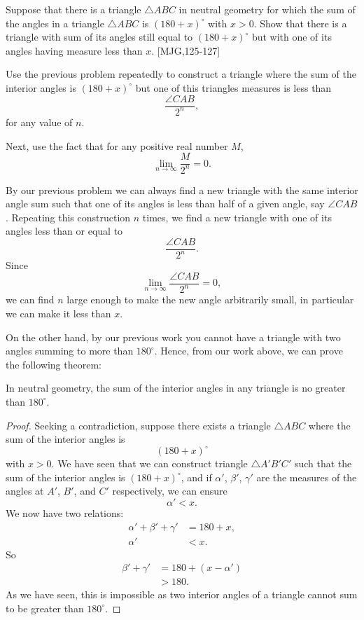 \documentclass[instructornotes]{ximera}
\begin{document}
\begin{problem}
\label{121} Suppose that there is a triangle $\triangle ABC$ in
neutral geometry for which the sum of the angles in a triangle $\triangle
ABC$ is $\left( 180+x\right)^\circ$ with $x>0$. Show that there is a
triangle with sum of its angles still equal to $\left(180+x\right)^\circ$
but with one of its angles having measure less than $x$. [MJG,125-127]


\begin{hint}
Use the previous problem repeatedly to construct a triangle where the sum of the
interior angles is $(180+x)^\circ$ but one of this triangles measures is less than
\[
\frac{\angle CAB}{2^n},
\]
for any value of $n$.
\end{hint}
\begin{hint}
Next, use the fact that for any positive real number $M$,
\[
\lim_{n\to \infty}\frac{M}{2^n} = 0.
\]
\end{hint}
\begin{freeResponse}
By our previous problem we can always find a new triangle with the
same interior angle sum such that one of its angles is less than half
of a given angle, say $\angle CAB$. Repeating this construction $n$
times, we find a new triangle with one of its angles less than or
equal to
\[
\frac{\angle CAB}{2^n}.
\]
Since 
\[
\lim_{n\to \infty}\frac{\angle CAB}{2^n} = 0,
\]
we can find $n$ large enough to make the new angle arbitrarily small, in
particular we can make it less than $x$.
\end{freeResponse}

\end{problem}


On the other hand, by our previous work
you cannot have a triangle with two angles summing to more than
$180^\circ$. Hence, from our work above, we can prove the following
theorem:

\begin{theorem}
In neutral geometry, the sum of the interior angles in any triangle is no greater
than $180^\circ$.
\end{theorem}

\begin{proof}
Seeking a contradiction, suppose there exists a triangle $\triangle
ABC$ where the sum of the interior angles is 
\[
\left(180+x\right)^\circ
\]
with $x>0$. We have seen that we can construct triangle $\triangle
A'B'C'$ such that the sum of the interior angles is $(180+x)^\circ$,
and if $\alpha'$, $\beta'$, $\gamma'$ are the measures of the angles
at $A'$, $B'$, and $C'$ respectively, we can ensure 
\[
\alpha' < x.
\]
We now have two relations:
\begin{align*}
\alpha' + \beta' + \gamma' &= 180 + x,\\
\alpha' &< x.
\end{align*}
So%
\begin{align*}
\beta'+\gamma'&=180+\left(x-\alpha'\right)\\
&>180.
\end{align*}
As we have seen, this is impossible as two interior angles of a
triangle cannot sum to be greater than $180^\circ$.
\end{proof}
\end{document}
